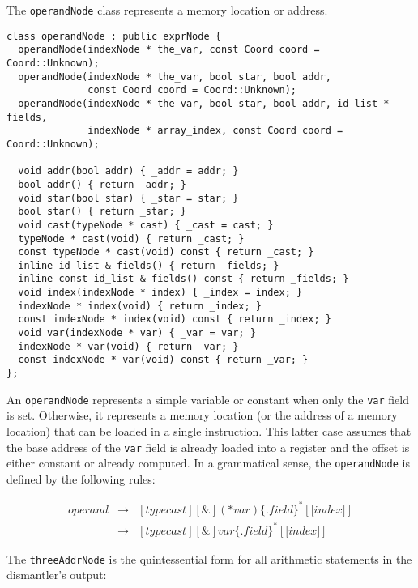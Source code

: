 The \texttt{operandNode} class represents a memory location or address.

\begin{small}
\begin{verbatim}
class operandNode : public exprNode {
  operandNode(indexNode * the_var, const Coord coord = Coord::Unknown);
  operandNode(indexNode * the_var, bool star, bool addr, 
              const Coord coord = Coord::Unknown);
  operandNode(indexNode * the_var, bool star, bool addr, id_list * fields, 
              indexNode * array_index, const Coord coord = Coord::Unknown);

  void addr(bool addr) { _addr = addr; }
  bool addr() { return _addr; }
  void star(bool star) { _star = star; }
  bool star() { return _star; }
  void cast(typeNode * cast) { _cast = cast; }
  typeNode * cast(void) { return _cast; }
  const typeNode * cast(void) const { return _cast; }
  inline id_list & fields() { return _fields; }
  inline const id_list & fields() const { return _fields; }
  void index(indexNode * index) { _index = index; }
  indexNode * index(void) { return _index; }
  const indexNode * index(void) const { return _index; }
  void var(indexNode * var) { _var = var; }
  indexNode * var(void) { return _var; }
  const indexNode * var(void) const { return _var; }
};
\end{verbatim}
\end{small}

An \texttt{operandNode} represents a simple variable or constant when only
the \texttt{var} field is set.  Otherwise, it represents a memory location
(or the address of a memory location) that can be loaded in a single
instruction.  This latter case assumes that the base address of the
\texttt{var} field is already loaded into a register and the offset is either
constant or already computed.  In a grammatical sense, the
\texttt{operandNode} is defined by the following rules:

\begin{eqnarray*}
operand & \rightarrow & [typecast][\texttt{\&}] (\texttt{*} var) \{.field\}^*
          [ \texttt{[} index \texttt{]}] \\
        & \rightarrow & [typecast][\texttt{\&}] var \{.field\}^*
          [ \texttt{[} index \texttt{]}]
\end{eqnarray*}

The \texttt{threeAddrNode} is the quintessential form for all arithmetic
statements in the dismantler's output:  

